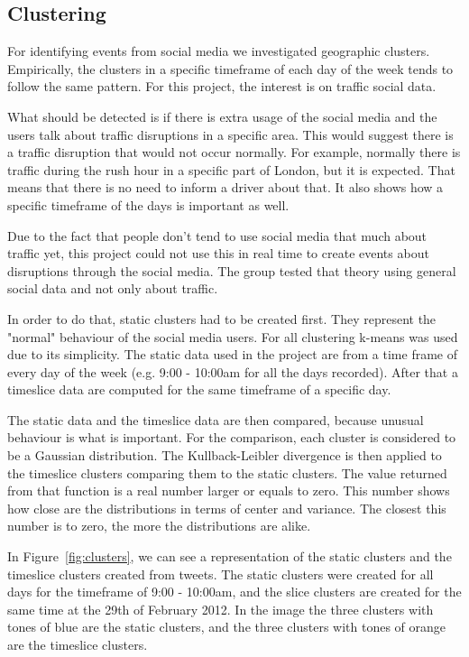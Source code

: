 \subsection{Clustering}

For identifying events from social media we investigated geographic clusters.
Empirically, the clusters in a specific timeframe of each day of
the week tends to follow the same pattern. For this project, the interest is on
traffic social data.

What should be detected is if there is extra usage of the social media and the users talk about
traffic disruptions in a specific area. This would suggest there is a traffic
disruption that would not occur normally. For example, normally there is traffic during
the rush hour in a specific part of London, but it is expected. That means that
there is no need to inform a driver about that. It also shows how a specific
timeframe of the days is important as well.

Due to the fact that people don't tend to use social media that much about
traffic yet, this project could not use this in real time to create events
about disruptions through the social media. The group
tested that theory using general social data and not only about traffic.

In order to do that, static clusters had to be created first.
They represent the "normal" behaviour of the social media users. For all clustering
k-means\cite{website:k-means} was used due to its simplicity. The static data used in the project are
from a time frame of every day of the week (e.g. 9:00 - 10:00am for all the
days recorded). After that a timeslice data are computed for the same timeframe
of a specific day.

The static data and the timeslice data are then compared, because unusual
behaviour is what is important. For the comparison, each cluster is considered
to be a Gaussian distribution\cite{website:gaussian}. The Kullback-Leibler
divergence\cite{Kullback} is then applied to the timeslice clusters comparing
them to the static clusters. The value returned from that function is a real
number larger or equals to zero. This number shows how close are the
distributions in terms of center and variance. The closest this number is to
zero, the more the distributions are alike.

In Figure~\ref{fig:clusters}, we can see a representation of the static clusters and the
timeslice clusters created from tweets. The static clusters were created for
all days for the timeframe of 9:00 - 10:00am, and the slice clusters are
created for the same time at the 29th of February 2012. In the image the three
clusters with tones of blue are the static clusters, and the three clusters
with tones of orange are the timeslice clusters.

